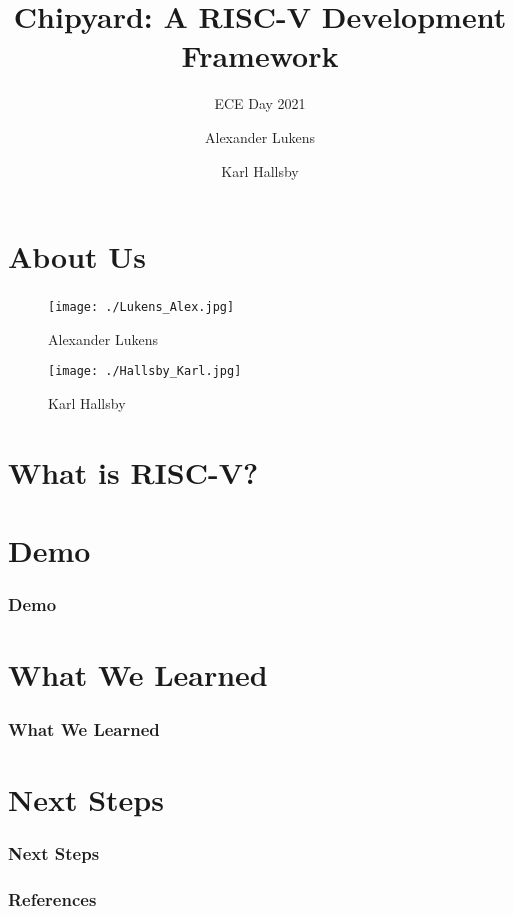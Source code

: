 \documentclass{eceday}
\title[Chipyard]{Chipyard: A RISC-V Development Framework}
\subtitle{ECE Day 2021}
\author{Alexander Lukens \and Karl Hallsby}
\institute{Illinois Institute of Technology}
\date{\DTMdisplaydate{2021}{4}{9}{-1}}
\begin{document}
\nocite{chipyard}

\begin{frame}
  \titlepage{}
\end{frame}

\section{About Us}\label{sec:About_Us}
\begin{frame}
  \frametitle{}
  \begin{figure}[h!tbp]
    \centering
    \texttt{[image: ./Lukens\_Alex.jpg]}
    \caption*{Alexander Lukens}
    \label{fig:Alex_Lukens}
  \end{figure}
  \begin{figure}[h!tbp]
    \centering
    \texttt{[image: ./Hallsby\_Karl.jpg]}
    \caption*{Karl Hallsby}
    \label{fig:Karl_Hallsby}
  \end{figure}
\end{frame}

\section{What is RISC-V?}\label{sec:What_is_RISC-V}
\begin{frame}
  \frametitle{}
\end{frame}

\section{Demo}\label{sec:Demo}
\begin{frame}
	\frametitle{Demo}
\end{frame}

\section{What We Learned}\label{sec:What_We_Learned}
\begin{frame}
  \frametitle{What We Learned}
\end{frame}

\section{Next Steps}\label{sec:Next_Steps}
\begin{frame}
  \frametitle{Next Steps}
\end{frame}

\begin{frame}
  \frametitle{References}

  \printbibliography[heading=bibintoc]{}
\end{frame}
\end{document}
